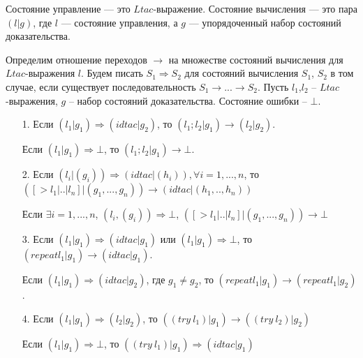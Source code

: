 \documentclass[12pt]{article}
\begin{document}
Состояние управление — это  $Ltac$-выражение.
Состояние вычисления — это пара $(l | g)$, где $l$ — состояние управления, а $g$ — упорядоченный набор состояний доказательства.

Определим отношение переходов $\xrightarrow{}$ на множестве состояний вычисления для $Ltac$-выражения $l$.
Будем писать $S_1 \Rightarrow S_2$ для состояний вычисления $S_1$, $S_2$ в том случае, если существует последовательность $S_1 \xrightarrow{} ... \xrightarrow{} S_2$.
Пусть $l_1$,$l_2$ -- $Ltac$-выражения, $g$ -- набор состояний доказательства. Состояние ошибки -- $\bot$.

\begin{enumerate}
    \item[1.] Если $(l_1|g_1) \Rightarrow (idtac|g_2)$, то $(l_1;l_2|g_1) \xrightarrow{} (l_2|g_2)$.
    \item[  ] Если $(l_1|g_1) \Rightarrow \bot$, то $(l_1;l_2|g_1) \xrightarrow{} \bot$.
    \item[2.] Если  $(l_i|(g_i)) \Rightarrow (idtac|(h_i)), \forall i = 1,...,n$, то $([>l_1|..|l_n]|(g_1,...,g_n)) \xrightarrow{} (idtac|(h_1,..,h_n))$
    \item[  ] Если $\exists i=1,...,n$, $(l_i, (g_i)) \Rightarrow \bot$, $([>l_1|..|l_n]|(g_1,...,g_n)) \xrightarrow{} \bot$
    
    \item[3.] Если $(l_1|g_1) \Rightarrow (idtac|g_1)$ или $(l_1|g_1) \Rightarrow \bot$, то $(repeat l_1|g_1) \xrightarrow{} (idtac|g_1)$.
    \item[  ] Если $(l_1|g_1) \Rightarrow (idtac|g_2)$, где $g_1 \neq g_2$, то $(repeat l_1|g_1) \xrightarrow{} (repeat l_1|g_2)$.
    
    \item[4.] Если $(l_1|g_1) \Rightarrow (l_2|g_2)$, то
    $((try\ l_1)| g_1) \xrightarrow{} ((try\ l_2)| g_2)$
    \item[]   Если $(l_1|g_1) \Rightarrow{} \bot$, то
    $((try\ l_1)| g_1) \Rightarrow{} (idtac| g_1)$
    

\end{enumerate}
\end{document}
